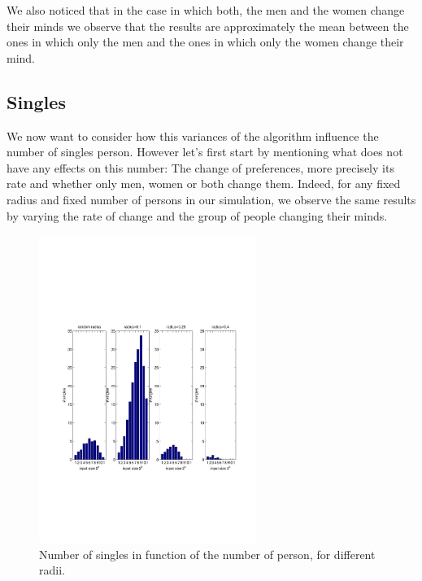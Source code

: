 \documentclass[11pt]{article}
\begin{document}
We also noticed that in the case in which both, the men and the women change their minds we 
observe that the results are approximately the mean between the ones in which only the men and 
the ones in which only the women change their mind.

\subsection{Singles}

We now want to consider how this variances of the algorithm influence the number of singles
person. However let's first start by mentioning what does not have any effects on this number: 
The change of preferences, more precisely its rate and whether only men, women or both 
change them. Indeed, for any fixed radius and fixed number of persons in our simulation, we 
observe the same results by varying the rate of change and the group of people changing their 
minds.

\begin{figure}[t]
	\includegraphics[trim=0 180 0 180, clip, height=10cm]{../figures/singles}
	\caption{Number of singles in function of the number of person, for different radii.}
	\label{fig:singles}
\end{figure}
\end{document}

